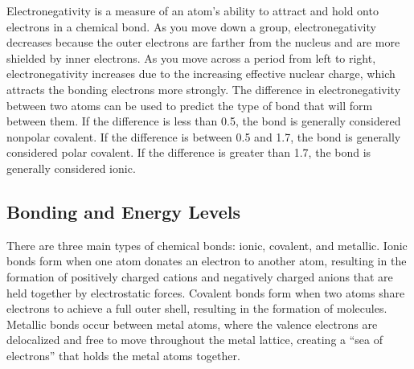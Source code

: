 Electronegativity is a measure of an atom's ability to attract and hold onto electrons in a chemical bond. As you move down a group, electronegativity decreases because the outer electrons are farther from the nucleus and are more shielded by inner electrons. As you move across a period from left to right, electronegativity increases due to the increasing effective nuclear charge, which attracts the bonding electrons more strongly. The difference in electronegativity between two atoms can be used to predict the type of bond that will form between them. If the difference is less than 0.5, the bond is generally considered nonpolar covalent. If the difference is between 0.5 and 1.7, the bond is generally considered polar covalent. If the difference is greater than 1.7, the bond is generally considered ionic.
\subsection{Bonding and Energy Levels}
There are three main types of chemical bonds: ionic, covalent, and metallic. Ionic bonds form when one atom donates an electron to another atom, resulting in the formation of positively charged cations and negatively charged anions that are held together by electrostatic forces. Covalent bonds form when two atoms share electrons to achieve a full outer shell, resulting in the formation of molecules. Metallic bonds occur between metal atoms, where the valence electrons are delocalized and free to move throughout the metal lattice, creating a ``sea of electrons'' that holds the metal atoms together.
